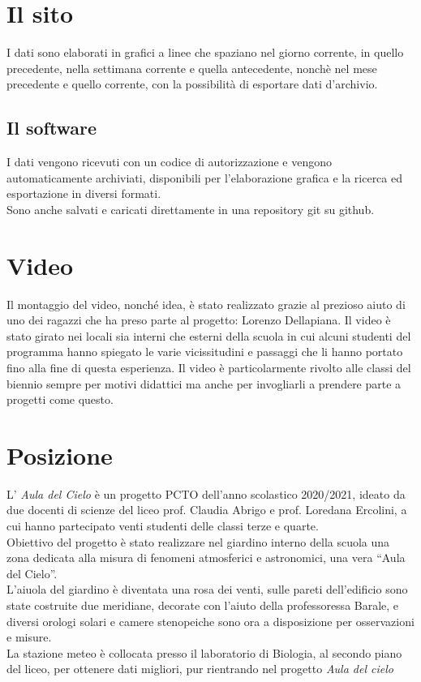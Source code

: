 \documentclass{article}
\begin{document}
\section{Il sito}
I dati sono elaborati in grafici a linee che spaziano nel giorno corrente, in quello precedente, nella settimana corrente e quella antecedente, nonchè nel mese precedente e quello corrente, con la possibilità di esportare dati d'archivio.\\
\subsection{Il software}
I dati vengono ricevuti con un codice di autorizzazione e vengono automaticamente archiviati, disponibili per l'elaborazione grafica e la ricerca ed esportazione in diversi formati.\\
Sono anche salvati e caricati direttamente in una repository git su github.
\section{Video}
Il montaggio del video, nonché idea,  è stato realizzato grazie al prezioso aiuto di uno dei ragazzi che ha preso parte al progetto: Lorenzo Dellapiana.
Il video è stato girato nei locali sia interni che esterni della scuola in cui alcuni studenti del programma hanno spiegato le varie vicissitudini e passaggi che li hanno portato fino alla fine di questa esperienza. Il video è particolarmente rivolto alle classi del biennio sempre per motivi didattici ma anche per invogliarli a prendere parte a progetti come questo.
\section{Posizione}
L' \emph{Aula del Cielo} è un progetto PCTO dell’anno scolastico 2020/2021, ideato da due docenti di scienze del liceo prof. Claudia Abrigo e prof. Loredana Ercolini, a cui hanno partecipato venti studenti delle classi terze e quarte.\\
Obiettivo del progetto è stato realizzare  nel giardino interno della scuola una zona dedicata alla misura di fenomeni atmosferici e astronomici, una vera “Aula del Cielo”. \\
L’aiuola del giardino è diventata una rosa dei venti, sulle pareti dell’edificio sono state costruite due meridiane, decorate con l’aiuto della professoressa Barale, e diversi orologi solari e camere stenopeiche sono ora a disposizione per osservazioni e misure.\\
La stazione meteo è collocata presso il laboratorio di Biologia, al secondo piano del liceo, per ottenere dati migliori, pur rientrando nel progetto \emph{Aula del cielo}
\end{document}
